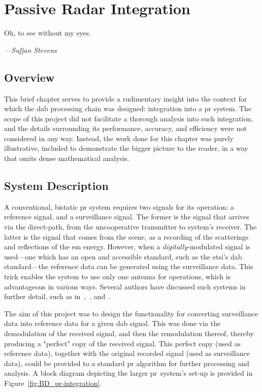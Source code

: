 \documentclass[class=report,11pt,crop=false]{standalone}
\begin{document}
\chapter{Passive Radar Integration \label{ch:pr-integration}}
\epigraph{Oh, to see without my eyes.}%
    {\emph{---Sufjan Stevens}}

\section{Overview}
This brief chapter serves to provide a rudimentary insight into the context for which the \gls{dab} processing chain was designed: integration into a \gls{pr} system. The scope of this project did not facilitate a thorough analysis into such integration, and the details surrounding its performance, accuracy, and efficiency were not considered in any way. Instead, the work done for this chapter was purely illustrative, included to demonstrate the bigger picture to the reader, in a way that omits dense mathematical analysis.

\section{System Description}
A conventional, bistatic \gls{pr} system requires two signals for its operation: a reference signal, and a surveillance signal. The former is the signal that arrives via the direct-path, from the uncooperative transmitter to system's receiver. The latter is the signal that comes from the scene, as a recording of the scatterings and reflections of the \gls{em} energy. However, when a \emph{digitally}-modulated signal is used---one which has an open and accessible standard, such as the \gls{etsi}'s \gls{dab} standard---the reference data can be generated using the surveillance data. This trick enables the system to use only one antenna for operations, which is advantageous in various ways. Several authors have discussed such systems in further detail, such as in~\cite{Barott2014},~\cite{Searle2015}, and~\cite{Fang2018}.

The aim of this project was to design the functionality for converting surveillance data into reference data for a given \gls{dab} signal. This was done via the demodulation of the received signal, and then the remodulation thereof, thereby producing a "perfect" copy of the received signal. This perfect copy (used as reference data), together with the original recorded signal (used as surveillance data), could be provided to a standard \gls{pr} algorithm for further processing and analysis. A block diagram depicting the larger \gls{pr}~system's set-up is provided in Figure~\ref{fig:BD_pr-integration}.
\end{document}
